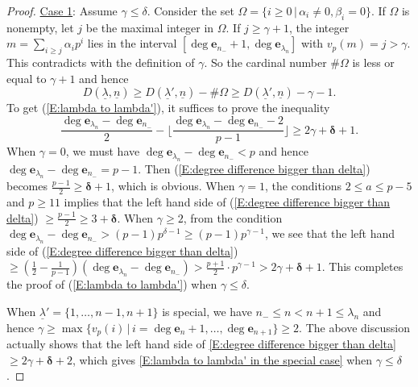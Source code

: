\documentclass[12pt]{amsart}
\theoremstyle{definition}
\numberwithin{equation}{subsection}
\def\bfe{\mathbf{e}}
\begin{document}
\begin{proof}
\smallskip
\underline{Case 1}: Assume $\gamma\leq \delta$. Consider the set $\Omega=\{i\geq 0\,|\, \alpha_i\neq 0, \beta_i=0 \}$. If $\Omega$ is nonempty, let $j$ be the maximal integer in $\Omega$. If $j\geq \gamma+1$, the integer $m=\sum\limits_{i\geq j}\alpha_ip^i$ lies in the interval $[\deg\bfe_{n_-}+1,\deg\bfe_{\lambda_n}]$ with $v_p(m)=j>\gamma$. This contradicts with the definition of $\gamma$. So the cardinal number $\# \Omega$ is less or equal to $ \gamma+1$ and hence 
		\[
		D(\underline \lambda,\underline n)\geq D(\underline \lambda',\underline n)- \# \Omega\geq D(\underline \lambda',\underline n)-\gamma-1.
		\]
		To get (\ref{E:lambda to lambda'}), it suffices to prove the inequality
		\begin{equation}
		\label{E:degree difference bigger than delta} \frac {\deg \bfe_{\lambda_n} - \deg \bfe_{n_-}}2-\Big\lfloor\frac{\deg \bfe_{\lambda_n} - \deg \bfe_{n_-}-2}{p-1}\Big\rfloor \geq 2\gamma+\boldsymbol{\delta}+1.
		\end{equation}
		When $\gamma=0$, we must have $\deg \bfe_{\lambda_n}-\deg \bfe_{n_-}<p$ and hence $\deg \bfe_{\lambda_n}-\deg \bfe_{n_-}=p-1$. Then (\ref{E:degree difference bigger than delta}) becomes $\frac{p-1}2\geq \boldsymbol{\delta}+1$, which is obvious. When $\gamma=1$, the conditions $2\leq a\leq p-5$ and $p\geq 11$ implies that the left hand side of (\ref{E:degree difference bigger than delta}) $\geq \frac {p-1}2\geq 3+\boldsymbol{\delta}$. When $\gamma\geq 2$, from the condition $\deg \bfe_{\lambda_n}-\deg \bfe_{n_-}>(p-1)p^{\delta-1}\geq (p-1)p^{\gamma-1}$, we see that the left hand side of (\ref{E:degree difference bigger than delta}) $\geq (\frac 12 -\frac 1{p-1})(\deg \bfe_{\lambda_n}-\deg \bfe_{n_-})>\frac{p+1}{2}\cdot p^{\gamma-1}>2\gamma+\boldsymbol{\delta}+1$. This completes the proof of (\ref{E:lambda to lambda'}) when $\gamma\leq \delta$. 

        When $\underline\lambda'=\{1,\dots,n-1,n+1\}$ is special, we have $n_-\leq n<n+1\leq \lambda_n$ and hence $\gamma\geq \max\{v_p(i)\,|\,i=\deg \bfe_n+1,\dots, \deg \bfe_{n+1} \}\geq 2$. The above discussion actually shows that the left hand side of \eqref{E:degree difference bigger than delta} $\geq 2\gamma+\boldsymbol{\delta}+2$, which gives \eqref{E:lambda to lambda' in the special case} when $\gamma\leq \delta$.


\end{proof}
\end{document}
